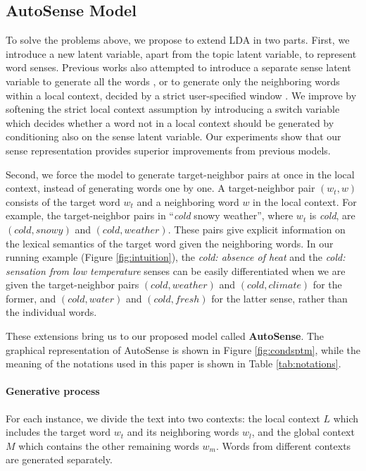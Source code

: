 \documentclass[letterpaper]{article}
\begin{document}
\subsection{AutoSense Model}

To solve the problems above, we propose to extend LDA in two parts. First, we introduce a new latent variable, apart from the topic latent variable, to represent word senses. Previous works also attempted to introduce a separate sense latent variable to generate all the words \cite{chang2014inducing}, or to generate only the neighboring words within a local context, decided by a strict user-specified window \cite{wang2015sense}. We improve by softening the strict local context assumption by introducing a switch variable which decides whether a word not in a local context should be generated by conditioning also on the sense latent variable. Our experiments show that our sense representation provides superior improvements from previous models.

Second, we force the model to generate target-neighbor pairs at once in the local context, instead of generating words one by one. A target-neighbor pair $(w_t, w)$ consists of the target word $w_t$ and a neighboring word $w$ in the local context. For example, the target-neighbor pairs in ``\textit{cold} snowy weather'', where $w_t$ is \textit{cold}, are $(cold,snowy)$ and $(cold,weather)$. These pairs give explicit information on the lexical semantics of the target word given the neighboring words. In our running example (Figure \ref{fig:intuition}), the \textit{cold: absence of heat} and the \textit{cold: sensation from low temperature} senses can be easily differentiated when we are given the target-neighbor pairs $(cold,weather)$ and $(cold,climate)$ for the former, and $(cold,water)$ and $(cold,fresh)$ for the latter sense, rather than the individual words.

These extensions bring us to our proposed model called \textbf{AutoSense}. The graphical representation of AutoSense is shown in Figure \ref{fig:condsptm}, while the meaning of the notations used in this paper is shown in Table \ref{tab:notations}.

\paragraph{Generative process}

For each instance, we divide the text into two contexts: the local context $L$ which includes the target word $w_t$ and its neighboring words $w_l$, and the global context $M$ which contains the other remaining words $w_m$. Words from different contexts are generated separately.
\end{document}
